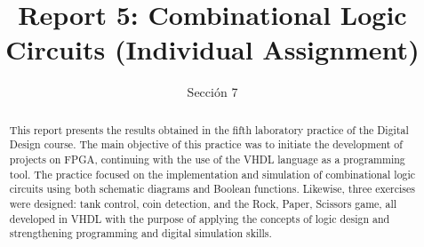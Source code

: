 \documentclass{article}
\begin{document}
\renewcommand{\footrulewidth}{1pt}
\renewcommand{\tablename}{Tabla}
\author{}%
\title{Report 5: Combinational Logic Circuits (Individual Assignment)}%
\date{Sección 7}%
\maketitle
\begin{abstract}
This report presents the results obtained in the fifth laboratory practice of the Digital Design course. The main objective of this practice was to initiate the development of projects on FPGA, continuing with the use of the VHDL language as a programming tool. The practice focused on the implementation and simulation of combinational logic circuits using both schematic diagrams and Boolean functions. Likewise, three exercises were designed: tank control, coin detection, and the Rock, Paper, Scissors game, all developed in VHDL with the purpose of applying the concepts of logic design and strengthening programming and digital simulation skills. 
\end{abstract}
\end{document}
